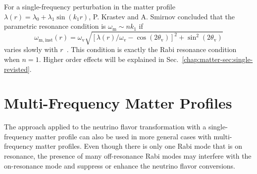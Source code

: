 
For a single-frequency perturbation in the matter profile $\lambda(r) =\lambda_0 +  \lambda_1\sin(k_1 r)$, P. Krastev and A. Smirnov concluded that the parametric resonance condition is $\omega_{\mathrm{m}} \sim n k_1$ if
\begin{equation}
    \omega_{\mathrm{m,inst}}(r) = \omega_{\mathrm{v}} \sqrt{ \left[ \lambda(r)/\omega_{\mathrm{v}} - \cos (2\theta_{\mathrm{v}}) \right]^2 + \sin^2(2\theta_{\mathrm{v}}) }
\end{equation}
varies slowly with $r$~\cite{Krastev1989}. This condition is exactly the Rabi resonance condition when $n=1$. Higher order effects will be explained in Sec.~\ref{chap:matter-sec:single-revisted}.





\section{\label{chap:matter-sec:multiple-matter-frequencies}Multi-Frequency Matter Profiles}


The approach applied to the neutrino flavor transformation with a single-frequency matter profile can also be used in more general cases with multi-frequency matter profiles. Even though there is only one Rabi mode that is on resonance, the presence of many off-resonance Rabi modes may interfere with the on-resonance mode and suppress or enhance the neutrino flavor conversions.

